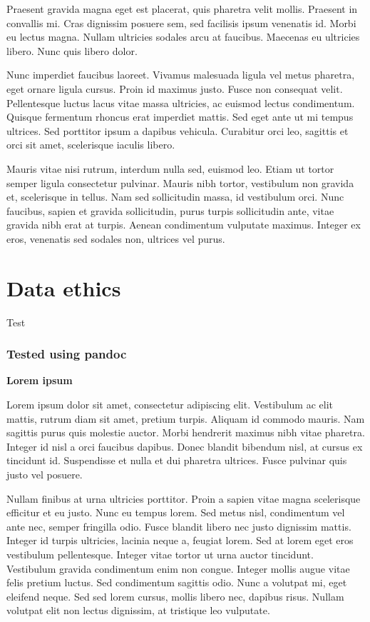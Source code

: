 \documentclass[
]{book}
\begin{document}
Praesent gravida magna eget est placerat, quis pharetra velit mollis. Praesent in convallis mi. Cras dignissim posuere sem, sed facilisis ipsum venenatis id. Morbi eu lectus magna. Nullam ultricies sodales arcu at faucibus. Maecenas eu ultricies libero. Nunc quis libero dolor.

Nunc imperdiet faucibus laoreet. Vivamus malesuada ligula vel metus pharetra, eget ornare ligula cursus. Proin id maximus justo. Fusce non consequat velit. Pellentesque luctus lacus vitae massa ultricies, ac euismod lectus condimentum. Quisque fermentum rhoncus erat imperdiet mattis. Sed eget ante ut mi tempus ultrices. Sed porttitor ipsum a dapibus vehicula. Curabitur orci leo, sagittis et orci sit amet, scelerisque iaculis libero.

Mauris vitae nisi rutrum, interdum nulla sed, euismod leo. Etiam ut tortor semper ligula consectetur pulvinar. Mauris nibh tortor, vestibulum non gravida et, scelerisque in tellus. Nam sed sollicitudin massa, id vestibulum orci. Nunc faucibus, sapien et gravida sollicitudin, purus turpis sollicitudin ante, vitae gravida nibh erat at turpis. Aenean condimentum vulputate maximus. Integer ex eros, venenatis sed sodales non, ultrices vel purus.

\hypertarget{data-ethics}{%
\chapter{Data ethics}\label{data-ethics}}

Test

\hypertarget{tested-using-pandoc}{%
\subsection{Tested using pandoc}\label{tested-using-pandoc}}

\textbf{Lorem ipsum}

Lorem ipsum dolor sit amet, consectetur adipiscing elit. Vestibulum ac
elit mattis, rutrum diam sit amet, pretium turpis. Aliquam id commodo
mauris. Nam sagittis purus quis molestie auctor. Morbi hendrerit maximus
nibh vitae pharetra. Integer id nisl a orci faucibus dapibus. Donec
blandit bibendum nisl, at cursus ex tincidunt id. Suspendisse et nulla
et dui pharetra ultrices. Fusce pulvinar quis justo vel posuere.

Nullam finibus at urna ultricies porttitor. Proin a sapien vitae magna
scelerisque efficitur et eu justo. Nunc eu tempus lorem. Sed metus nisl,
condimentum vel ante nec, semper fringilla odio. Fusce blandit libero
nec justo dignissim mattis. Integer id turpis ultricies, lacinia neque
a, feugiat lorem. Sed at lorem eget eros vestibulum pellentesque.
Integer vitae tortor ut urna auctor tincidunt. Vestibulum gravida
condimentum enim non congue. Integer mollis augue vitae felis pretium
luctus. Sed condimentum sagittis odio. Nunc a volutpat mi, eget eleifend
neque. Sed sed lorem cursus, mollis libero nec, dapibus risus. Nullam
volutpat elit non lectus dignissim, at tristique leo vulputate.
\end{document}
